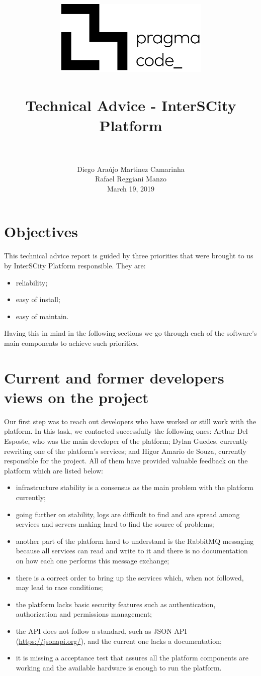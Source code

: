 \documentclass[paper=a4, fontsize=11pt]{scrartcl}
\title{
  \usefont{OT1}{bch}{b}{n}
  \normalfont \normalsize \includegraphics[width=10em]{pc_h_preto} \\ [25pt]
  \horrule{0.5pt} \\[0.4cm]
  \huge Technical Advice - InterSCity Platform \\
  \horrule{2pt} \\[0.5cm]
}
\author{
  \normalfont \normalsize
  Diego Araújo Martinez Camarinha\\[-3pt]    \normalsize
  Rafael Reggiani Manzo\\[-3pt]    \normalsize
  March 19, 2019
}
\date{}
\numberwithin{equation}{section}    %
\numberwithin{figure}{section}      %
\numberwithin{table}{section}        %
\begin{document}
\maketitle

\section{Objectives}
  This technical advice report is guided by three priorities that were brought to us by InterSCity Platform responsible. They are:

  \begin{itemize}
    \item reliability;
    \item easy of install;
    \item easy of maintain.
  \end{itemize}

  Having this in mind in the following sections we go through each of the software's main components to achieve such priorities.

\section{Current and former developers views on the project}
  Our first step was to reach out developers who have worked or still work with the platform. In this task, we contacted successfully the following ones: Arthur Del Esposte, who was the main developer of the platform; Dylan Guedes, currently rewriting one of the platform's services; and Higor Amario de Souza, currently responsible for the project. All of them have provided valuable feedback on the platform which are listed below:

  \begin{itemize}
    \item infrastructure stability is a consensus as the main problem with the platform currently;
    \item going further on stability, logs are difficult to find and are spread among services and servers making hard to find the source of problems;
    \item another part of the platform hard to understand is the RabbitMQ messaging because all services can read and write to it and there is no documentation on how each one performs this message exchange;
    \item there is a correct order to bring up the services which, when not followed, may lead to race conditions;
    \item the platform lacks basic security features such as authentication, authorization and permissions management;
    \item the API does not follow a standard, such as JSON API (\url{https://jsonapi.org/}), and the current one lacks a documentation;
    \item it is missing a acceptance test that assures all the platform components are working and the available hardware is enough to run the platform.
  \end{itemize}
\end{document}
